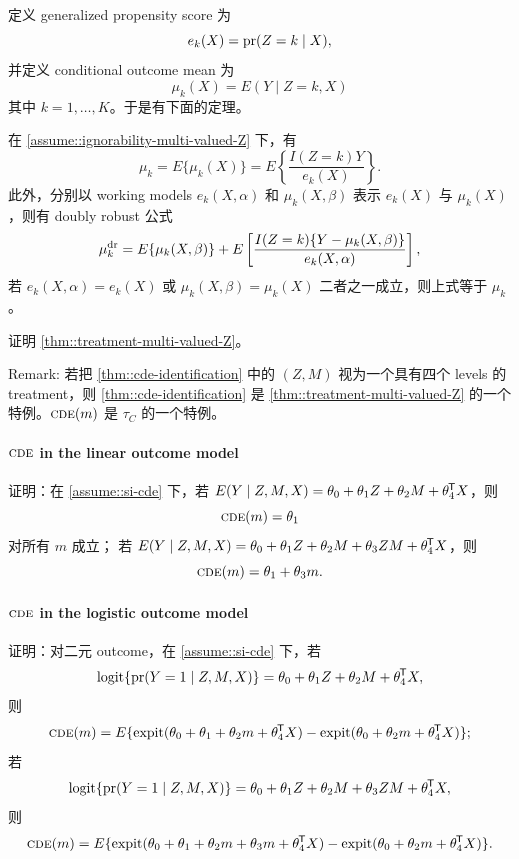 定义 generalized propensity score 为
$$
e_k(X) = \textup{pr}(Z = k \mid X), 
$$
并定义 conditional outcome mean 为
$$
\mu_k(X) = E(   Y \mid Z=k,  X )
$$
其中 $k=1, \ldots, K$。于是有下面的定理。

\begin{theorem}
\label{thm::treatment-multi-valued-Z}
在 \cref{assume::ignorability-multi-valued-Z} 下，有
$$
\mu_{k} = E\{  \mu_{k}(X) \}
= E \left\{   \frac{I(Z = k) Y}{  e_{k}(X)  }  \right\} .
$$
此外，分别以 working models $e_{k}(X, \alpha) $ 和 $\mu_{k}(X, \beta) $ 表示 $e_{k}(X) $ 与 $\mu_{k}(X) $，则有 doubly robust 公式
$$
\mu_{k}^{\textup{dr}}  = E\{  \mu_{k}(X, \beta) \} + E \left[   \frac{I(Z=k) \{ Y - \mu_{k}(X, \beta)  \}}{  e_{k}(X, \alpha)  }  \right],
$$
若 $e_{k}(X, \alpha) = e_{k}(X)$ 或 $\mu_{k}(X, \beta)  = \mu_{k}(X)$ 二者之一成立，则上式等于 $\mu_{k} $。
\end{theorem}


证明 \cref{thm::treatment-multi-valued-Z}。


Remark: 若把 \cref{thm::cde-identification} 中的 $(Z,M)$ 视为一个具有四个 levels 的 treatment，则 \cref{thm::cde-identification} 是 \cref{thm::treatment-multi-valued-Z} 的一个特例。$  \textsc{cde} (m) $ 是 $\tau_C $ 的一个特例。


  
  \paragraph{$\textsc{cde}$ in the linear outcome model}\label{problem::cde-linear}
  
  证明：在 \cref{assume::si-cde} 下，若 $E(Y\mid Z, M, X ) = \theta_0 + \theta_1 Z + \theta_2 M +   \theta_4^{\mkern-1.5mu\mathsf{T}} X$，则
  $$
  \textsc{cde} (m) = \theta_1
  $$
  对所有 $m$ 成立；
  若 $E(Y\mid Z, M, X ) = \theta_0 + \theta_1 Z + \theta_2 M + \theta_3 ZM +    \theta_4^{\mkern-1.5mu\mathsf{T}} X$，则
  $$
\textsc{cde}(m) =   \theta_1 + \theta_3 m. 
  $$
  
  
    \paragraph{$\textsc{cde}$ in the logistic outcome model}\label{problem::cde-logit}
  
  证明：对二元 outcome，在 \cref{assume::si-cde} 下，若
  $$
  \textup{logit} \{ \textup{pr}(Y = 1\mid Z, M, X ) \} = \theta_0 + \theta_1 Z + \theta_2 M +   \theta_4^{\mkern-1.5mu\mathsf{T}} X ,
  $$ 
  则
  $$
  \textsc{cde} (m) = E\{ \textup{expit}( \theta_0 + \theta_1  + \theta_2 m +   \theta_4^{\mkern-1.5mu\mathsf{T}} X ) - \textup{expit}( \theta_0    + \theta_2 m +   \theta_4^{\mkern-1.5mu\mathsf{T}} X ) \} ; 
  $$
  若
  $$
  \textup{logit} \{ \textup{pr}(Y = 1\mid Z, M, X ) \} = \theta_0 + \theta_1 Z + \theta_2 M + \theta_3 ZM +    \theta_4^{\mkern-1.5mu\mathsf{T}} X,
  $$ 
  则
  $$
\textsc{cde}(m) =  E\{ \textup{expit}( \theta_0 + \theta_1  + \theta_2 m  +\theta_3 m +   \theta_4^{\mkern-1.5mu\mathsf{T}} X ) - \textup{expit}( \theta_0    + \theta_2 m +   \theta_4^{\mkern-1.5mu\mathsf{T}} X ) \}.
  $$
  
  
  
   

